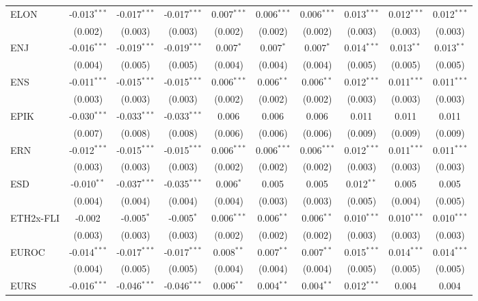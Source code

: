 \begin{table}[!htbp]
\begin{tabular}{@{\extracolsep{5pt}}lccccccccc}
 ELON & -0.013$^{***}$ & -0.017$^{***}$ & -0.017$^{***}$ & 0.007$^{***}$ & 0.006$^{***}$ & 0.006$^{***}$ & 0.013$^{***}$ & 0.012$^{***}$ & 0.012$^{***}$ \\
  & (0.002) & (0.003) & (0.003) & (0.002) & (0.002) & (0.002) & (0.003) & (0.003) & (0.003) \\
 ENJ & -0.016$^{***}$ & -0.019$^{***}$ & -0.019$^{***}$ & 0.007$^{*}$ & 0.007$^{*}$ & 0.007$^{*}$ & 0.014$^{***}$ & 0.013$^{**}$ & 0.013$^{**}$ \\
  & (0.004) & (0.005) & (0.005) & (0.004) & (0.004) & (0.004) & (0.005) & (0.005) & (0.005) \\
 ENS & -0.011$^{***}$ & -0.015$^{***}$ & -0.015$^{***}$ & 0.006$^{***}$ & 0.006$^{**}$ & 0.006$^{**}$ & 0.012$^{***}$ & 0.011$^{***}$ & 0.011$^{***}$ \\
  & (0.003) & (0.003) & (0.003) & (0.002) & (0.002) & (0.002) & (0.003) & (0.003) & (0.003) \\
 EPIK & -0.030$^{***}$ & -0.033$^{***}$ & -0.033$^{***}$ & 0.006$^{}$ & 0.006$^{}$ & 0.006$^{}$ & 0.011$^{}$ & 0.011$^{}$ & 0.011$^{}$ \\
  & (0.007) & (0.008) & (0.008) & (0.006) & (0.006) & (0.006) & (0.009) & (0.009) & (0.009) \\
 ERN & -0.012$^{***}$ & -0.015$^{***}$ & -0.015$^{***}$ & 0.006$^{***}$ & 0.006$^{***}$ & 0.006$^{***}$ & 0.012$^{***}$ & 0.011$^{***}$ & 0.011$^{***}$ \\
  & (0.003) & (0.003) & (0.003) & (0.002) & (0.002) & (0.002) & (0.003) & (0.003) & (0.003) \\
 ESD & -0.010$^{**}$ & -0.037$^{***}$ & -0.035$^{***}$ & 0.006$^{*}$ & 0.005$^{}$ & 0.005$^{}$ & 0.012$^{**}$ & 0.005$^{}$ & 0.005$^{}$ \\
  & (0.004) & (0.004) & (0.004) & (0.004) & (0.003) & (0.003) & (0.005) & (0.004) & (0.005) \\
 ETH2x-FLI & -0.002$^{}$ & -0.005$^{*}$ & -0.005$^{*}$ & 0.006$^{***}$ & 0.006$^{**}$ & 0.006$^{**}$ & 0.010$^{***}$ & 0.010$^{***}$ & 0.010$^{***}$ \\
  & (0.003) & (0.003) & (0.003) & (0.002) & (0.002) & (0.002) & (0.003) & (0.003) & (0.003) \\
 EUROC & -0.014$^{***}$ & -0.017$^{***}$ & -0.017$^{***}$ & 0.008$^{**}$ & 0.007$^{**}$ & 0.007$^{**}$ & 0.015$^{***}$ & 0.014$^{***}$ & 0.014$^{***}$ \\
  & (0.004) & (0.005) & (0.005) & (0.004) & (0.004) & (0.004) & (0.005) & (0.005) & (0.005) \\
 EURS & -0.016$^{***}$ & -0.046$^{***}$ & -0.046$^{***}$ & 0.006$^{**}$ & 0.004$^{**}$ & 0.004$^{**}$ & 0.012$^{***}$ & 0.004$^{}$ & 0.004$^{}$ \\

\end{tabular}
\end{table}

